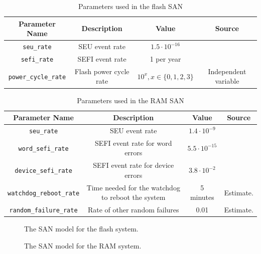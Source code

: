 \begin{table}[width = 0.5\textwidth]
\centering
\begin{tabular}{|c|c|c|c|}
\hline
{\bf Parameter Name} & {\bf Description} & {\bf Value} & {\bf Source}\\
\hline
\texttt{seu\_rate} & SEU event rate & $1.5\cdot 10^{-16}$ & \cite{Oldham2008TID} \\
\texttt{sefi\_rate} & SEFI event rate & 1 per year & \cite{Oldham2008TID} \\
\texttt{power\_cycle\_rate} & Flash power cycle rate & $10^x, x\in\{0, 1, 2, 3\}$ & Independent variable \\
\hline
\end{tabular}
\caption{Parameters used in the flash SAN}
\label{tab:flashparameters}
\end{table}

\begin{table}[width = 0.5\textwidth]
\centering
\begin{tabular}{|c|c|c|c|}
\hline
{\bf Parameter Name} & {\bf Description} & {\bf Value} & {\bf Source}\\
\hline
\texttt{seu\_rate} & SEU event rate & $1.4 \cdot 10^{-9}$ & \cite{Gliem2012Memory} \\
\texttt{word\_sefi\_rate} & SEFI event rate for word errors & $5.5 \cdot 10^{-15}$ & \cite{Gliem2012Memory} \\
\texttt{device\_sefi\_rate} & SEFI event rate for device errors & $3.8 \cdot 10^{-2}$ & \cite{Gliem2012Memory} \\
\texttt{watchdog\_reboot\_rate} & Time needed for the watchdog to reboot the system & 5 minutes & Estimate.\\
\texttt{random\_failure\_rate} & Rate of other random failures & 0.01 & Estimate.\\
\hline
\end{tabular}
\caption{Parameters used in the RAM SAN}
\label{tab:ramparameters}
\end{table}

\begin{figure}
\centering
\caption{The SAN model for the flash system.}
\label{fig:flashsan}
\end{figure}


\begin{figure}
\centering
\caption{The SAN model for the RAM system.}
\label{fig:ramsan}
\end{figure}


